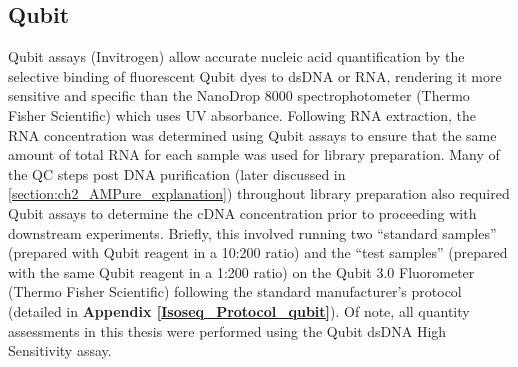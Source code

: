 \subsection{Qubit}
\label{section:ch2_qubit}   
Qubit assays (Invitrogen) allow accurate nucleic acid quantification by the selective binding of fluorescent Qubit dyes to dsDNA or RNA, rendering it more sensitive and specific than the NanoDrop 8000 spectrophotometer (Thermo Fisher Scientific) which uses UV absorbance. Following RNA extraction, the RNA concentration was determined using Qubit assays to ensure that the same amount of total RNA for each sample was used for library preparation. Many of the QC steps post DNA purification (later discussed in \cref{section:ch2_AMPure_explanation}) throughout library preparation also required Qubit assays to determine the cDNA concentration prior to proceeding with downstream experiments. Briefly, this involved running two “standard samples” (prepared with Qubit reagent in a 10:200 ratio) and the “test samples” (prepared with the same Qubit reagent in a 1:200 ratio) on the Qubit 3.0 Fluorometer (Thermo Fisher Scientific) following the standard manufacturer's protocol (detailed in \textbf{Appendix  \ref{Isoseq_Protocol_qubit}}). Of note, all quantity assessments in this thesis were performed using the Qubit dsDNA High Sensitivity assay.          

